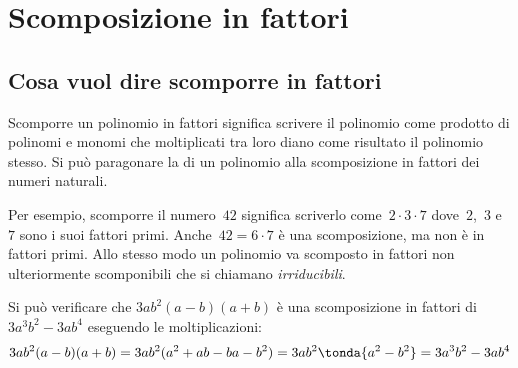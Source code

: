
\section{Scomposizione in fattori}

\subsection{Cosa vuol dire scomporre in fattori}
\label{subsec:divpol_scomporre}

Scomporre un polinomio in fattori significa scrivere il polinomio come 
prodotto di polinomi e monomi che
moltiplicati tra loro diano come risultato il polinomio stesso. 
Si può paragonare la 
di un polinomio alla scomposizione in fattori dei numeri naturali.

\begin{minipage}{.4\textwidth}
\begin{inaccessibleblock}
\begin{center}
% 
\scompfattnum
\end{center}
\end{inaccessibleblock}
\end{minipage}
\begin{minipage}{.6\textwidth}
\begin{inaccessibleblock}
\begin{center}
% 
\scompfattpol
\end{center}
\end{inaccessibleblock}
\end{minipage}

Per esempio, scomporre il numero~\(42\) significa scriverlo 
come~\(2\cdot 3 \cdot 7\) dove~\(2\),~\(3\) e~\(7\) sono i suoi fattori 
primi.
Anche~\(42 = 6 \cdot 7\) è una scomposizione, ma non è in fattori primi. 
Allo stesso modo un polinomio va scomposto in fattori non ulteriormente
scomponibili che si chiamano 
\emph{irriducibili}. 

Si può verificare che \(3ab^{2}(a-b)(a+b)\) è una scomposizione in 
fattori di \(3a^{3}b^{2}-3ab^{4}\) eseguendo le moltiplicazioni:
\[3ab^{2}(a-b)(a+b)=3ab^{2}(a^{2}+ab-ba-b^{2})=
  3ab^{2}\tonda{a^{2}-b^{2}}=3a^{3}b^{2}-3ab^{4}\]

